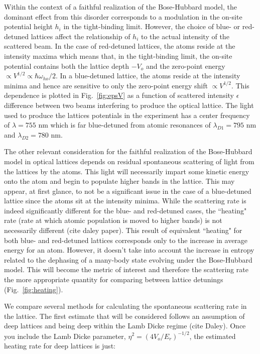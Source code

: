 Within the context of a faithful realization of the Bose-Hubbard model, the dominant effect from this disorder corresponds to a modulation in the on-site potential height $h_i$ in the tight-binding limit. However, the choice of blue- or red-detuned lattices affect the relationship of $h_i$ to the actual intensity of the scattered beam. In the case of red-detuned lattices, the atoms reside at the intensity maxima which means that, in the tight-binding limit, the on-site potential contains both the lattice depth $-V_o$ and the zero-point energy $\propto V^{1/2} \propto \hbar \omega_{ho}/2$. In a blue-detuned lattice, the atoms reside at the intensity minima and hence are sensitive to only the zero-point energy shift $\propto V^{1/2}$. This dependence is plotted in Fig.~\ref{fig:epsV} as a function of scattered intensity $\epsilon$ difference between two beams interfering to produce the optical lattice. The light used to produce the lattices potentials in the experiment has a center frequency of $\lambda=755$ nm which is far blue-detuned from atomic resonances of $\lambda_{D1} = 795$ nm and $\lambda_{D2}=780$ nm. 

The other relevant consideration for the faithful realization of the Bose-Hubbard model in optical lattices depends on residual spontaneous scattering of light from the lattices by the atoms. This light will necessarily impart some kinetic energy onto the atom and begin to populate higher bands in the lattice. This may appear, at first glance, to not be a significant issue in the case of a blue-detuned lattice since the atoms sit at the intensity minima. While the scattering rate is indeed significantly different for the blue- and red-detuned cases, the ``heating" rate (rate at which atomic population is moved to higher bands) is not necessarily different (cite daley paper). This result of equivalent ``heating" for both blue- and red-detuned lattices corresponds only to the increase in average energy for an atom. However, it doesn't take into account the increase in entropy related to the dephasing of a many-body state evolving under the Bose-Hubbard model. This will become the metric of interest and therefore the scattering rate the more appropriate quantity for comparing between lattice detunings (Fig.~\ref{fig:heating}).

We compare several methods for calculating the spontaneous scattering rate in the lattice. The first estimate that will be considered follows an assumption of deep lattices and being deep within the Lamb Dicke regime (cite Daley). Once you include the Lamb Dicke parameter,  $\eta^2=(4V_o/E_r)^{-1/2}$, the estimated heating rate for deep lattices is just:

